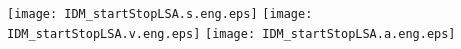\documentclass[a4paper,12pt]{article}
\begin{document}

\begin{center}
\texttt{[image: IDM\_startStopLSA.s.eng.eps]} 
\texttt{[image: IDM\_startStopLSA.v.eng.eps]}
\texttt{[image: IDM\_startStopLSA.a.eng.eps]}
\end{center}

\end{document}
